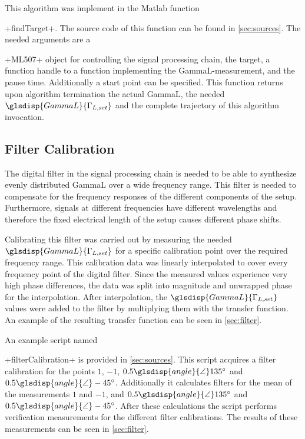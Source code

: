 \documentclass[12pt,a4paper,parskip=full,abstract=true,BCOR=12mm,twoside,open=right]{scrreprt}
\newcommand*{\SavedLstInline}{}
\DeclareRobustCommand*{\lstinline}{%
  \ifmmode
    \let\SavedBGroup\bgroup
    \def\bgroup{%
      \let\bgroup\SavedBGroup
      \hbox\bgroup
    }%
  \fi
  \SavedLstInline
}
\newcommand{\Angle}{\glsdisp{angle}{\angle}}
\begin{document}
This algorithm was implement in the Matlab function \lstinline+findTarget+.
The source code of this function can be found in \cref{sec:sources}. The needed
arguments are a \lstinline+ML507+ object for controlling the signal processing
chain, the target, a function handle to a function implementing the
\gls{GammaL}-measurement, and the pause time. Additionally a start point
can be specified. This function returns upon algorithm termination the actual
\gls{GammaL}, the needed $\glsdisp{GammaL}{\Gamma_{L,set}}$ and the complete
trajectory of this algorithm invocation.


\subsection{Filter Calibration}
\label{sec:filtercal}

The digital filter in the signal processing chain is needed to be able to
synthesize evenly distributed \gls{GammaL} over a wide frequency range. This
filter is needed to compensate for the frequency responses of the different
components of the setup. Furthermore, signals at different frequencies have different
wavelengths and therefore the fixed electrical length of the setup causes
different phase shifts.

Calibrating this filter was carried out by measuring the needed
$\glsdisp{GammaL}{\Gamma_{L,set}}$ for a specific calibration point over
the required frequency range. This calibration data was linearly interpolated to
cover every frequency point of the digital filter. Since the measured values
experience very high phase differences, the data was split into magnitude and
unwrapped phase for the interpolation. After interpolation, the
$\glsdisp{GammaL}{\Gamma_{L,set}}$ values were added to the filter by multiplying
them with the transfer function. An example of the resulting transfer function
can be seen in \cref{sec:filter}.

An example script named \lstinline+filterCalibration+ is provided in
\cref{sec:sources}. This script acquires a filter calibration for the points
$1$, $-1$, $0.5\Angle\SI{135}{\degree}$ and $0.5\Angle\SI{-45}{\degree}$.
Additionally it calculates filters for the mean of the measurements $1$ and $-1$,
and $0.5\Angle\SI{135}{\degree}$ and $0.5\Angle\SI{-45}{\degree}$. After these
calculations the script performs verification measurements for the different
filter calibrations. The results of these measurements can be seen in \cref{sec:filter}.
\end{document}

